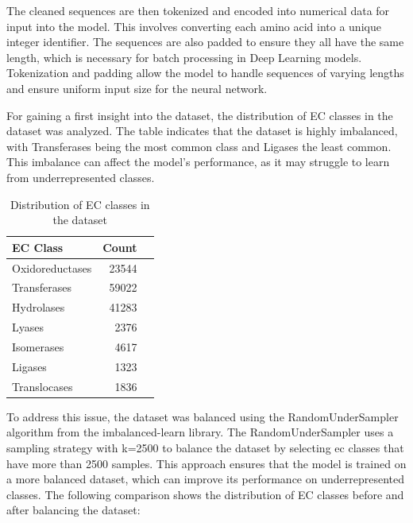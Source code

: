The cleaned sequences are then tokenized and encoded into numerical data for input into the model. This involves converting each amino acid into a unique integer identifier. The sequences are also padded to ensure they all have the same length, which is necessary for batch processing in Deep Learning models. Tokenization and padding allow the model to handle sequences of varying lengths and ensure uniform input size for the neural network. \autocite{dangRepeatedPaddingData2024}

For gaining a first insight into the dataset, the distribution of EC classes in the dataset was analyzed. The table indicates that the dataset is highly imbalanced, with Transferases being the most common class and Ligases the least common. This imbalance can affect the model's performance, as it may struggle to learn from underrepresented classes.

\begin{table}[!htbp]
    \centering
    \begin{tabular}{lrr}
        \toprule
        EC Class & Count \\
        \midrule
        Oxidoreductases & 23544 \\
        Transferases & 59022 \\
        Hydrolases & 41283 \\
        Lyases & 2376 \\
        Isomerases & 4617 \\
        Ligases & 1323 \\
        Translocases & 1836 \\
        \bottomrule
    \end{tabular}
    \caption{Distribution of EC classes in the dataset}
    \label{tab:ec-class-distribution}
\end{table}

To address this issue, the dataset was balanced using the RandomUnderSampler algorithm from the imbalanced-learn library. The RandomUnderSampler uses a sampling strategy with k=2500 to balance the dataset by selecting ec classes that have more than 2500 samples. This approach ensures that the model is trained on a more balanced dataset, which can improve its performance on underrepresented classes. The following comparison shows the distribution of EC classes before and after balancing the dataset:


